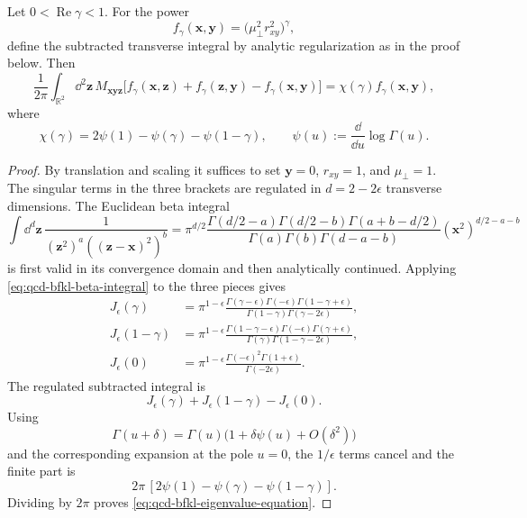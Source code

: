 \begin{proposition}
\label{prop:qcd-bfkl-mellin-eigenvalue}
Let \(0<\operatorname{Re}\gamma<1\).  For the power
\[
  f_\gamma(\mathbf x,\mathbf y)
  =
  \bigl(\mu_\perp^2 r_{xy}^2\bigr)^\gamma ,
\]
define the subtracted transverse integral by analytic regularization as in
the proof below.  Then
\begin{equation}
  \frac1{2\pi}\int_{\mathbb R^2}\dd^2\mathbf z\,
  M_{\mathbf x\mathbf y\mathbf z}
  \bigl[
    f_\gamma(\mathbf x,\mathbf z)
    +f_\gamma(\mathbf z,\mathbf y)
    -f_\gamma(\mathbf x,\mathbf y)
  \bigr]
  =
  \chi(\gamma)f_\gamma(\mathbf x,\mathbf y),
  \label{eq:qcd-bfkl-eigenvalue-equation}
\end{equation}
where
\begin{equation}
  \chi(\gamma)
  =
  2\psi(1)-\psi(\gamma)-\psi(1-\gamma),
  \qquad
  \psi(u):=\frac{\dd}{\dd u}\log\Gamma(u).
  \label{eq:qcd-bfkl-characteristic-function}
\end{equation}
\end{proposition}

\begin{proof}
By translation and scaling it suffices to set
\(\mathbf y=0\), \(r_{xy}=1\), and \(\mu_\perp=1\).  The singular terms in
the three brackets are regulated in \(d=2-2\epsilon\) transverse dimensions.
The Euclidean beta integral
\begin{equation}
  \int\dd^d\mathbf z\,
  \frac1{(\mathbf z^2)^a((\mathbf z-\mathbf x)^2)^b}
  =
  \pi^{d/2}
  \frac{
    \Gamma(d/2-a)\Gamma(d/2-b)\Gamma(a+b-d/2)
  }{
    \Gamma(a)\Gamma(b)\Gamma(d-a-b)
  }
  (\mathbf x^2)^{d/2-a-b}
  \label{eq:qcd-bfkl-beta-integral}
\end{equation}
is first valid in its convergence domain and then analytically continued.
Applying \eqref{eq:qcd-bfkl-beta-integral} to the three pieces gives
\[
\begin{aligned}
  J_\epsilon(\gamma)
  &=
  \pi^{1-\epsilon}
  \frac{
    \Gamma(\gamma-\epsilon)\Gamma(-\epsilon)
    \Gamma(1-\gamma+\epsilon)
  }{
    \Gamma(1-\gamma)\Gamma(\gamma-2\epsilon)
  },\\
  J_\epsilon(1-\gamma)
  &=
  \pi^{1-\epsilon}
  \frac{
    \Gamma(1-\gamma-\epsilon)\Gamma(-\epsilon)
    \Gamma(\gamma+\epsilon)
  }{
    \Gamma(\gamma)\Gamma(1-\gamma-2\epsilon)
  },\\
  J_\epsilon(0)
  &=
  \pi^{1-\epsilon}
  \frac{\Gamma(-\epsilon)^2\Gamma(1+\epsilon)}
       {\Gamma(-2\epsilon)} .
\end{aligned}
\]
The regulated subtracted integral is
\[
  J_\epsilon(\gamma)+J_\epsilon(1-\gamma)-J_\epsilon(0).
\]
Using
\[
  \Gamma(u+\delta)
  =
  \Gamma(u)\bigl(1+\delta\psi(u)+O(\delta^2)\bigr)
\]
and the corresponding expansion at the pole \(u=0\), the \(1/\epsilon\)
terms cancel and the finite part is
\[
  2\pi\,[2\psi(1)-\psi(\gamma)-\psi(1-\gamma)].
\]
Dividing by \(2\pi\) proves
\eqref{eq:qcd-bfkl-eigenvalue-equation}.
\end{proof}

